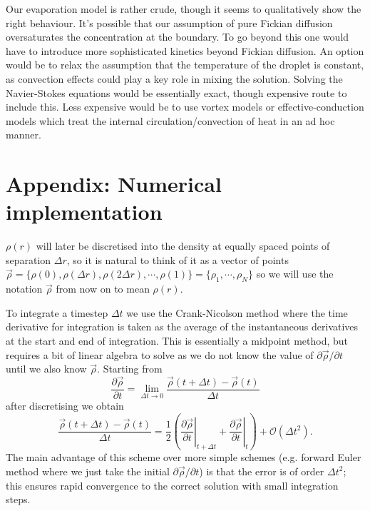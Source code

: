 \documentclass[11pt,twoside]{report}
\begin{document}
Our evaporation model is rather crude, though it seems to qualitatively show the right behaviour.
It's possible that our assumption of pure Fickian diffusion oversaturates the concentration at the boundary.
To go beyond this one would have to introduce more sophisticated kinetics beyond Fickian diffusion.
An option would be to relax the assumption that the temperature of the droplet is constant, as convection effects could play a key role in mixing the solution.
Solving the Navier-Stokes equations would be essentially exact, though expensive route to include this.
Less expensive would be to use vortex models or effective-conduction models which treat the internal circulation/convection of heat in an ad hoc manner.

\section*{Appendix: Numerical implementation}

$\rho(r)$ will later be discretised into the density at equally spaced points of separation $\Delta r$, so it is natural to think of it as a vector of points $\vec{\rho} = \{\rho(0), \rho(\Delta r), \rho(2 \Delta r), \cdots, \rho(1)\} = \{\rho_1, \cdots, \rho_N\}$ so we will use the notation $\vec{\rho}$ from
now on to mean $\rho(r)$.

To integrate a timestep $\Delta t$ we use the Crank-Nicolson \cite{Crank1947} method where the time derivative for integration is taken as the average of the instantaneous derivatives at the start and end of integration.
This is essentially a midpoint method, but requires a bit of linear algebra to solve as we do not know the value of $\partial \vec{\rho} / \partial t$ until we also know $\vec{\rho}$.
Starting from
\begin{equation}
  \frac{\partial \vec{\rho}}{\partial t} =
  \lim_{\Delta t \to 0} \frac{\vec{\rho}(t + \Delta t) - \vec{\rho}(t)}{\Delta t}
\end{equation}
after discretising we obtain
\begin{equation}
  \frac{\vec{\rho}(t + \Delta t) - \vec{\rho}(t)}{\Delta t}
  =
  \frac{1}{2}
  \left(
  \left. \frac{\partial \vec{\rho}}{\partial t} \right|_{t + \Delta t}
  +
  \left. \frac{\partial \vec{\rho}}{\partial t} \right|_t
  \right)
  + \mathcal{O}(\Delta t^2).
\end{equation}
The main advantage of this scheme over more simple schemes (e.g. forward Euler method where we just take the initial $\partial \vec{\rho} / \partial t$) is that the error is of order $\Delta t^2$; this ensures rapid convergence to the correct solution with small integration steps.
\end{document}
